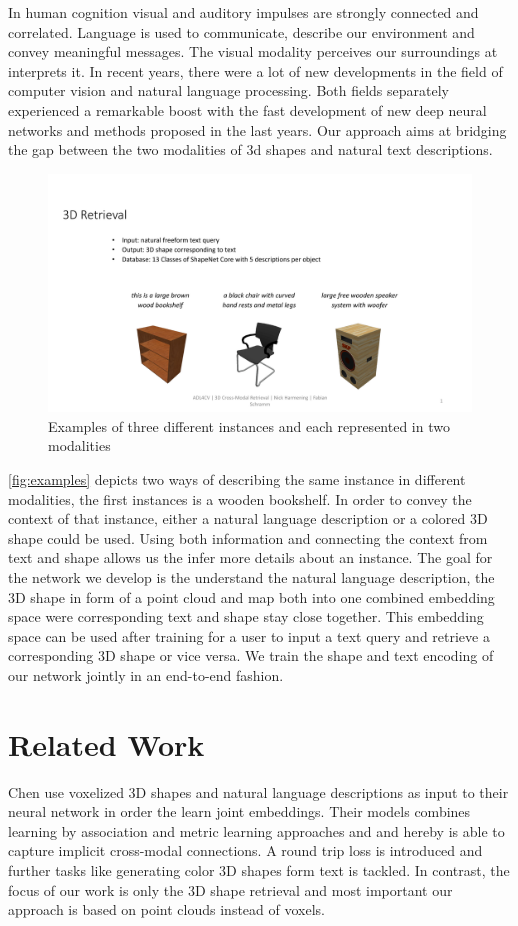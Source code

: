 \documentclass[10pt,twocolumn,letterpaper]{article}
\begin{document}
In human cognition visual and auditory impulses are strongly connected and correlated. Language is used to communicate, describe our environment and convey meaningful messages. The visual modality perceives our surroundings at interprets it. In recent years, there were a lot of new developments in the field of computer vision and natural language processing. Both fields separately experienced a remarkable boost with the fast development of new deep neural networks and methods proposed in the last years. Our approach aims at bridging the gap between the two modalities of 3d shapes and natural text descriptions.
\begin{figure}[h]%
	\centering
	\includegraphics[width=0.8\linewidth]{fig1.pdf}
	\caption[]{Examples of three different instances and each represented in two modalities}
	\label{fig:examples}
\end{figure}
\autoref{fig:examples} depicts two ways of describing the same instance in different modalities, \eg the first instances is a wooden bookshelf. In order to convey the context of that instance, either a natural language description or a colored 3D shape could be used. Using both information and connecting the context from text and shape allows us the infer more details about an instance. The goal for the network we develop is the understand the natural language description, the 3D shape in form of a point cloud and map both into one combined embedding space were corresponding text and shape stay close together. This embedding space can be used after training for a user to input a text query and retrieve a corresponding 3D shape or vice versa. We train the shape and text encoding of our network jointly in an end-to-end fashion. 

\section{Related Work}
Chen \etal \cite{chen2018text2shape} use voxelized 3D shapes and natural language descriptions as input to their neural network in order the learn joint embeddings. Their models combines learning by association and metric learning approaches and and hereby is able to capture implicit cross-modal connections. A round trip loss is introduced and further tasks like generating color 3D shapes form text is tackled. In contrast, the focus of our work is only the 3D shape retrieval and most important our approach is based on point clouds instead of voxels. 
\end{document}
